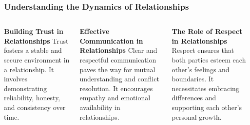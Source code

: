 \documentclass[5pt]{beamer}
\begin{document}
\begin{frame}
\frametitle{Understanding the Dynamics of Relationships}
\begin{columns}
\begin{column}{0.3\textwidth}
\begin{block}{\textbf{Building Trust in Relationships}}
Trust fosters a stable and secure environment in a relationship. It involves demonstrating reliability, honesty, and consistency over time.
\end{block}
\end{column}
\begin{column}{0.3\textwidth}
\begin{block}{\textbf{Effective Communication in Relationships}}
Clear and respectful communication paves the way for mutual understanding and conflict resolution. It encourages empathy and emotional availability in relationships.
\end{block}
\end{column}
\begin{column}{0.3\textwidth}
\begin{block}{\textbf{The Role of Respect in Relationships}}
Respect ensures that both parties esteem each other's feelings and boundaries. It necessitates embracing differences and supporting each other's personal growth.
\end{block}
\end{column}
\end{columns}
\end{frame}
\end{document}
